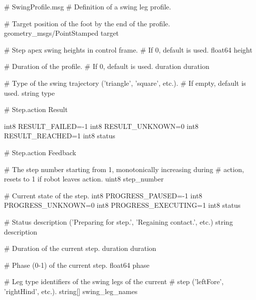 \begin{code}
# SwingProfile.msg
# Definition of a swing leg profile.

# Target position of the foot by the end of the profile.
geometry_msgs/PointStamped target

# Step apex swing heights in control frame.
# If 0, default is used.
float64 height

# Duration of the profile.
# If 0, default is used.
duration duration

# Type of the swing trajectory ('triangle', 'square', etc.).
# If empty, default is used.
string type
\end{code}


\begin{code}
# Step.action Result

int8 RESULT_FAILED=-1
int8 RESULT_UNKNOWN=0
int8 RESULT_REACHED=1
int8 status
\end{code}

\begin{code}
# Step.action Feedback

# The step number starting from 1, monotonically increasing during
# action, resets to 1 if robot leaves action.
uint8 step_number

# Current state of the step.
int8 PROGRESS_PAUSED=-1
int8 PROGRESS_UNKNOWN=0
int8 PROGRESS_EXECUTING=1
int8 status

# Status description ('Preparing for step.', 'Regaining contact.', etc.)
string description

# Duration of the current step.
duration duration

# Phase (0-1) of the current step.
float64 phase

# Leg type identifiers of the swing legs of the current
# step ('leftFore', 'rightHind', etc.).
string[] swing_leg_names
\end{code}